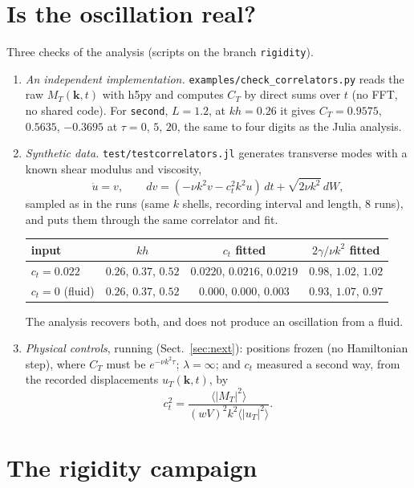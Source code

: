 \documentclass[11pt,aps,preprint,nofootinbib,superscriptaddress,tightenlines]{revtex4-2}
\def\st{\begin{equation}}
\def\stp{\end{equation}}
\def\Sect#1{Sect.~\ref{#1}}
\newcommand{\avg}[1]{\langle #1\rangle}
\begin{document}
\section{Is the oscillation real?}
\label{sec:checks}

Three checks of the analysis (scripts on the branch \texttt{rigidity}).
\begin{enumerate}
\item \emph{An independent implementation.}  \texttt{examples/check\_correlators.py} reads the
  raw $M_T(\bm k,t)$ with h5py and computes $C_T$ by direct sums over $t$ (no FFT, no shared
  code).  For \texttt{second}, $L=1.2$, at $kh=0.26$ it gives $C_T=0.9575$, $0.5635$, $-0.3695$
  at $\tau=0$, $5$, $20$, the same to four digits as the Julia analysis.
\item \emph{Synthetic data.}  \texttt{test/testcorrelators.jl} generates transverse modes with
  a known shear modulus and viscosity,
  \st
  \dot u=v,\qquad dv=(-\nu k^2v-c_t^2k^2u)\,dt+\sqrt{2\nu k^2}\,dW,
  \stp
  sampled as in the runs (same $k$ shells, recording interval and length, 8 runs), and puts
  them through the same correlator and fit.
  \begin{center}
  \begin{tabular}{lccc}
  \hline
  input & $kh$ & $c_t$ fitted & $2\gamma/\nu k^2$ fitted \\ \hline
  $c_t=0.022$ & $0.26$, $0.37$, $0.52$ & $0.0220$, $0.0216$, $0.0219$ & $0.98$, $1.02$, $1.02$ \\
  $c_t=0$ (fluid) & $0.26$, $0.37$, $0.52$ & $0.000$, $0.000$, $0.003$ & $0.93$, $1.07$, $0.97$ \\
  \hline
  \end{tabular}
  \end{center}
  The analysis recovers both, and does not produce an oscillation from a fluid.
\item \emph{Physical controls}, running (\Sect{sec:next}): positions frozen (no Hamiltonian
  step), where $C_T$ must be $e^{-\nu k^2\tau}$; $\lambda=\infty$; and $c_t$ measured a second
  way, from the recorded displacements $u_T(\bm k,t)$, by
  \st
  c_t^2=\frac{\avg{|M_T|^2}}{(wV)^2k^2\avg{|u_T|^2}} .
  \stp
\end{enumerate}

\section{The rigidity campaign}
\label{sec:rigidity}
\end{document}
